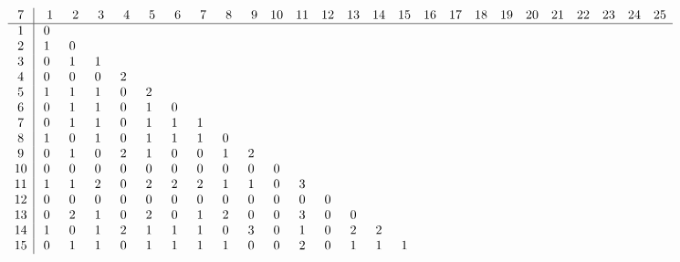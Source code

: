\begin{landscape}
\[
\begin{array}{c|ccccccccccccccccccccccccc}\addcontentsline{lot}{table}{\protect\numberline{}Dimensions of the Kernel of $\mathcal{L}_{r,c,7}$}
 7&  \phantom{0}1&  \phantom{0}2&  \phantom{0}3&  \phantom{0}4&  \phantom{0}5&  \phantom{0}6&  \phantom{0}7&  \phantom{0}8&  \phantom{0}9& 10& 11& 12& 13& 14& 15& 16& 17& 18& 19& 20& 21& 22& 23& 24& 25\\
\hline
 1&  0&   &   &   &   &   &   &   &   &   &   &   &   &   &   &   &   &   &   &   &   &   &   &   &   \\
 2&  1&  0&   &   &   &   &   &   &   &   &   &   &   &   &   &   &   &   &   &   &   &   &   &   &   \\
 3&  0&  1&  1&   &   &   &   &   &   &   &   &   &   &   &   &   &   &   &   &   &   &   &   &   &   \\
 4&  0&  0&  0&  2&   &   &   &   &   &   &   &   &   &   &   &   &   &   &   &   &   &   &   &   &   \\
 5&  1&  1&  1&  0&  2&   &   &   &   &   &   &   &   &   &   &   &   &   &   &   &   &   &   &   &   \\
 6&  0&  1&  1&  0&  1&  0&   &   &   &   &   &   &   &   &   &   &   &   &   &   &   &   &   &   &   \\
 7&  0&  1&  1&  0&  1&  1&  1&   &   &   &   &   &   &   &   &   &   &   &   &   &   &   &   &   &   \\
 8&  1&  0&  1&  0&  1&  1&  1&  0&   &   &   &   &   &   &   &   &   &   &   &   &   &   &   &   &   \\
 9&  0&  1&  0&  2&  1&  0&  0&  1&  2&   &   &   &   &   &   &   &   &   &   &   &   &   &   &   &   \\
10&  0&  0&  0&  0&  0&  0&  0&  0&  0&  0&   &   &   &   &   &   &   &   &   &   &   &   &   &   &   \\
11&  1&  1&  2&  0&  2&  2&  2&  1&  1&  0&  3&   &   &   &   &   &   &   &   &   &   &   &   &   &   \\
12&  0&  0&  0&  0&  0&  0&  0&  0&  0&  0&  0&  0&   &   &   &   &   &   &   &   &   &   &   &   &   \\
13&  0&  2&  1&  0&  2&  0&  1&  2&  0&  0&  3&  0&  0&   &   &   &   &   &   &   &   &   &   &   &   \\
14&  1&  0&  1&  2&  1&  1&  1&  0&  3&  0&  1&  0&  2&  2&   &   &   &   &   &   &   &   &   &   &   \\
15&  0&  1&  1&  0&  1&  1&  1&  1&  0&  0&  2&  0&  1&  1&  1&   &   &   &   &   &   &   &   &   &   \\

\end{array}\]
\end{landscape}
